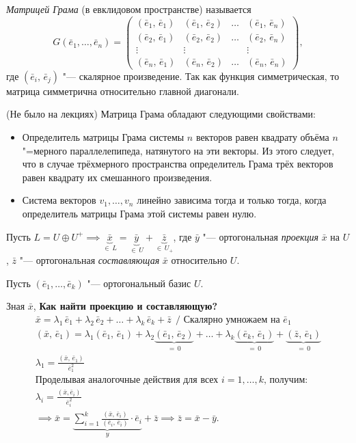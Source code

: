 \begin{definition}
  \textit{Матрицей Грама} (в евклидовом пространстве) называется $$
  G(\bar{e}_1, \ldots, \bar{e}_n) = \begin{pmatrix}
    (\bar{e}_1,\, \bar{e}_1) & (\bar{e}_1,\, \bar{e}_2) & \ldots & (\bar{e}_1,\, \bar{e}_n) \\
    (\bar{e}_2,\, \bar{e}_1) & (\bar{e}_2,\, \bar{e}_2) & \ldots & (\bar{e}_2,\, \bar{e}_n) \\
    \vdots & \vdots && \vdots \\
    (\bar{e}_n,\, \bar{e}_1) & (\bar{e}_n,\, \bar{e}_2) & \ldots & (\bar{e}_n,\, \bar{e}_n)
  \end{pmatrix},
  $$
  где $(\bar{e}_i,\, \bar{e}_j)$ "--- скалярное произведение. Так как функция симметрическая, то матрица симметрична относительно главной диагонали.
\end{definition}
(Не было на лекциях) Матрица Грама обладают следующими свойствами:
\begin{itemize}
  \item[] Определитель матрицы Грама системы $n$ векторов равен квадрату объёма 
  $n$"=мерного параллелепипеда, натянутого на эти векторы. Из этого следует, что в случае трёхмерного пространства определитель Грама трёх векторов равен квадрату их смешанного произведения.
  \item[] Система векторов $v_1, \ldots, v_n$ линейно зависима тогда и только тогда, когда определитель матрицы Грама этой системы равен нулю.
\end{itemize}

Пусть $L = U \oplus U^+ \implies \underbrace{\bar{x}}_{\in \, L} = \underbrace{\bar{y}}_{\in \, U} + \underbrace{\bar{z}}_{\in\, U_+}$, где $\bar{y}$ "--- ортогональная \textit{проекция} $\bar{x}$ на $U$, $\bar{z}$ "--- ортогональная \textit{составляющая} $\bar{x}$ относительно $U$.

Пусть $(\bar{e}_1, \ldots, \bar{e}_k)$ "--- ортогональный базис $U$.

Зная $\bar{x}$,
\textbf{Как найти проекцию и составляющую?}
\begin{gather*}
  \bar{x} = \lambda_1 \, \bar{e}_1 + \lambda_2 \, \bar{e}_2 + \ldots + \lambda_k \, \bar{e}_k + \bar{z} ~~/ \text{ Скалярно умножаем на } \bar{e}_1 \\
  (\bar{x}, \, \bar{e}_1) = \lambda_1(\bar{e}_1,\, \bar{e}_1) + \lambda_2\underbrace{(\bar{e}_1, \, \bar{e}_2)}_{ = \, 0} + \ldots + \lambda_k \underbrace{(\bar{e}_k, \, \bar{e}_1)}_{ = \, 0} + \underbrace{(\bar{z}, \, \bar{e}_1)}_{= \, 0} \\
  \lambda_1 = \frac{(\bar{x}, \, \bar{e}_1)}{\bar{e}_1^2} \\
  \text{Проделывая аналогочные действия для всех } i = 1, \ldots, k  \text{, получим:}\\
  \lambda_i = \frac{(\bar{x}, \bar{e}_i)}{\bar{e}_i^2} \\
  \implies \bar{x} = \underbrace{\sum_{i = 1}^{k} \frac{(\bar{x}, \, \bar{e}_i)}{(\bar{e}_i, \, \bar{e}_i)} \cdot \bar{e}_i}_{y} + \bar{z} \implies \bar{z} = \bar{x} - \bar{y}.  
\end{gather*}

